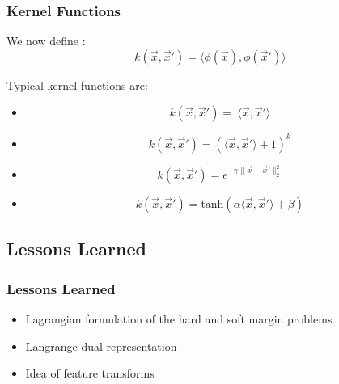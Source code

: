 \begin{frame}
  \frametitle{Kernel Functions}
  
  We now define :
  \begin{displaymath}
    k(\vec x, \vec x') =  \langle \phi(\vec x), \phi(\vec x') \rangle
  \end{displaymath}
  \pspread
 
  Typical kernel functions are: \\[.25cm]
 
  \small
  \begin{itemize}
    \item {} 
      \begin{displaymath}
        k(\vec x, \vec x') =~ \langle\vec x, \vec x'\rangle
      \end{displaymath}
    \item {} 
      \begin{displaymath}
        k(\vec x, \vec x') = (\langle\vec x, \vec x'\rangle + 1)^k
      \end{displaymath}
    \item {} 
      \begin{displaymath}
        k(\vec x, \vec x') = e^{-\gamma\|\vec x- \vec x'\|_2^2}
      \end{displaymath}
    \item {} 
      \begin{displaymath}
        k(\vec x, \vec x') =\mbox{tanh}({ \alpha \langle\vec x, \vec x'\rangle + \beta})
      \end{displaymath}
  \end{itemize}
\end{frame}


\subsection{Lessons Learned}

\begin{frame}
  \frametitle{Lessons Learned}
  
  \begin{itemize}
    \item Lagrangian formulation of the hard and soft margin problems \\[.5cm]
    \item Langrange dual representation \\[.5cm]
    \item Idea of feature transforms
  \end{itemize}
\end{frame}

